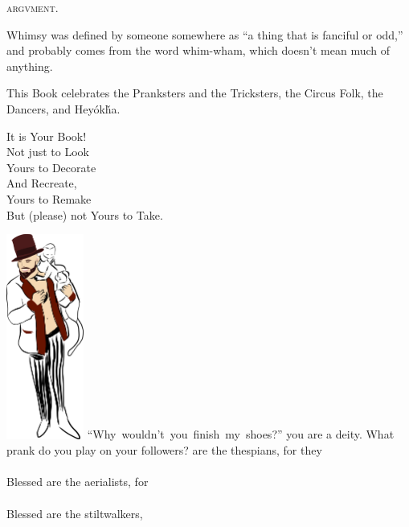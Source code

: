 \begin{center}
\booktitlefont\textsc{argvment.}
\end{center}
\begin{center}
\parbox{4.67in}{%
\begin{bookcomment}
Whimsy was defined by someone somewhere as ``a thing that is fanciful or odd,'' and probably comes from the word whim-wham, which doesn't mean much of anything.

This Book celebrates the Pranksters and the Tricksters, the Circus Folk, the Dancers, and Hey\'ok\v{h}a.\\

\bigskip
\begin{center}
It is Your Book!\\
Not just to Look\\
Yours to Decorate\\
And Recreate,\\
Yours to Remake\\
But (please) not Yours to Take.
\end{center}
\end{bookcomment}
}
\end{center}
\vfill
\includegraphics[width=1in]{images/monkey_circus.pdf}
\hbox{\footnotesize{``Why wouldn't you finish my shoes?''}}
\bversenonum {} you are a deity. What prank do you play on your followers?
\newpage%
\bversenonum {} are the thespians, for they\\
\\
\bverse Blessed are the aerialists, for\\
\\
\bverse Blessed are the stiltwalkers, \\

